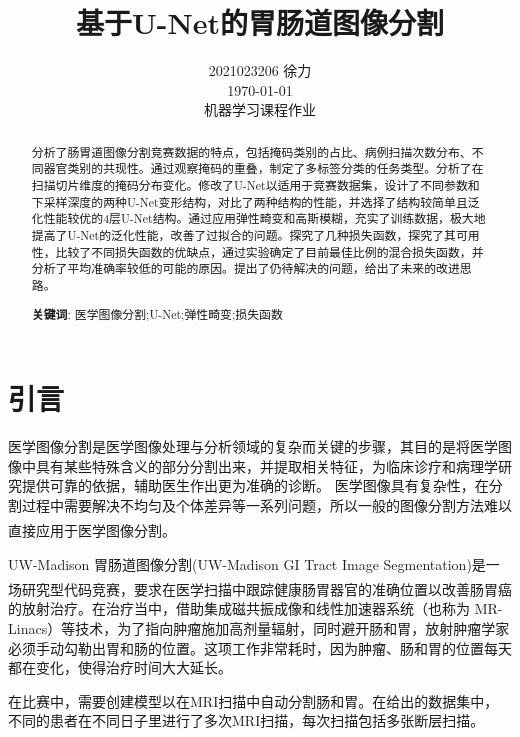 \documentclass[letterpaper, 10pt, conference, twoside]{ieeeconf}
\title{\LARGE \bf
基于U-Net的胃肠道图像分割
}
\author{2021023206 \quad 徐力\\ \today\\ 机器学习课程作业}
\newcommand{\upcite}[1]{\textsuperscript{\textsuperscript{\cite{#1}}}}
\begin{document}
\maketitle



\begin{abstract}
  分析了肠胃道图像分割竞赛数据的特点，包括掩码类别的占比、病例扫描次数分布、不同器官类别的共现性。通过观察掩码的重叠，制定了多标签分类的任务类型。分析了在扫描切片维度的掩码分布变化。修改了U-Net以适用于竞赛数据集，设计了不同参数和下采样深度的两种U-Net变形结构，对比了两种结构的性能，并选择了结构较简单且泛化性能较优的4层U-Net结构。通过应用弹性畸变和高斯模糊，充实了训练数据，极大地提高了U-Net的泛化性能，改善了过拟合的问题。探究了几种损失函数，探究了其可用性，比较了不同损失函数的优缺点，通过实验确定了目前最佳比例的混合损失函数，并分析了平均准确率较低的可能的原因。提出了仍待解决的问题，给出了未来的改进思路。

\vspace{1ex}\noindent\textbf{关键词}: 医学图像分割;U-Net;弹性畸变;损失函数

\end{abstract}


\section{引言}
医学图像分割是医学图像处理与分析领域的复杂而关键的步骤，其目的是将医学图像中具有某些特殊含义的部分分割出来，并提取相关特征，为临床诊疗和病理学研究提供可靠的依据，辅助医生作出更为准确的诊断。 医学图像具有复杂性，在分割过程中需要解决不均匀及个体差异等一系列问题，所以一般的图像分割方法难以直接应用于医学图像分割\upcite{c1}。

UW-Madison 胃肠道图像分割(UW-Madison GI Tract Image Segmentation)是一场研究型代码竞赛\upcite{c2}，要求在医学扫描中跟踪健康肠胃器官的准确位置以改善肠胃癌的放射治疗。在治疗当中，借助集成磁共振成像和线性加速器系统（也称为 MR-Linacs）等技术，为了指向肿瘤施加高剂量辐射，同时避开肠和胃，放射肿瘤学家必须手动勾勒出胃和肠的位置。这项工作非常耗时，因为肿瘤、肠和胃的位置每天都在变化，使得治疗时间大大延长。

在比赛中，需要创建模型以在MRI扫描中自动分割肠和胃。在给出的数据集中，不同的患者在不同日子里进行了多次MRI扫描，每次扫描包括多张断层扫描。
\end{document}
